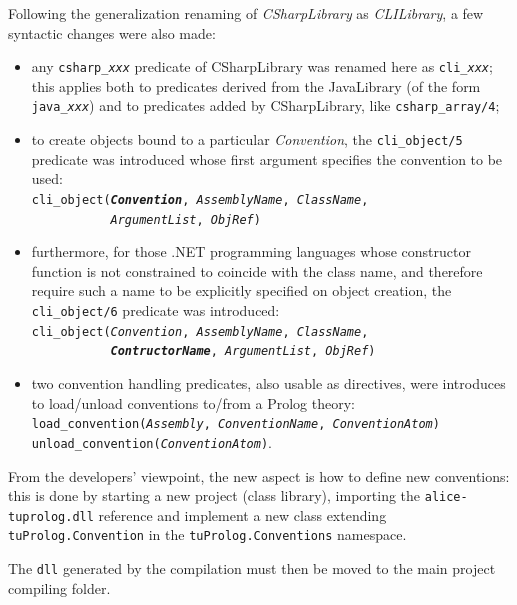 Following the generalization renaming of \textit{CSharpLibrary} as \textit{CLILibrary}, a few syntactic changes were also made:
\begin{itemize}
  \item any \texttt{csharp\_\textit{xxx}} predicate of CSharpLibrary was renamed here as \texttt{cli\_\textit{xxx}}; this applies both to predicates derived from the JavaLibrary (of the form \texttt{java\_\textit{xxx}}) and to predicates added by CSharpLibrary, like \texttt{csharp\_array/4};

 \item to create objects bound to a particular \textit{Convention}, the \texttt{cli\_object/5} predicate was introduced whose first argument specifies the convention to be used:\\
     \texttt{cli\_object(\textit{\textbf{Convention}}, \textit{AssemblyName}, \textit{ClassName},\\
     \mbox{~~~~~~~~~~~}\textit{ArgumentList}, \textit{ObjRef})}

 \item furthermore, for those .NET programming languages whose constructor function is not constrained to coincide with the class name, and therefore require such a name to be explicitly specified on object creation, the \texttt{cli\_object/6} predicate was introduced:\\
     \texttt{cli\_object(\textit{Convention}, \textit{AssemblyName}, \textit{ClassName},\\
     \mbox{~~~~~~~~~~~}\textbf{\textit{ContructorName}}, \textit{ArgumentList}, \textit{ObjRef})}

 \item two convention handling predicates, also usable as directives, were introduces to load/unload conventions to/from a Prolog theory:\\
     \texttt{load\_convention(\textit{Assembly}, \textit{ConventionName}, \textit{ConventionAtom})}\\
     \texttt{unload\_convention(\textit{ConventionAtom})}.
\end{itemize}

From the developers' viewpoint, the new aspect is how to define new conventions: this is done by starting a new project (class library), importing the \texttt{alice-tuprolog.dll} reference and implement a new class extending \texttt{tuProlog.Convention} in the \texttt{tuProlog.Conventions} namespace.

The \texttt{dll} generated by the compilation must then be moved to the main project compiling folder.


